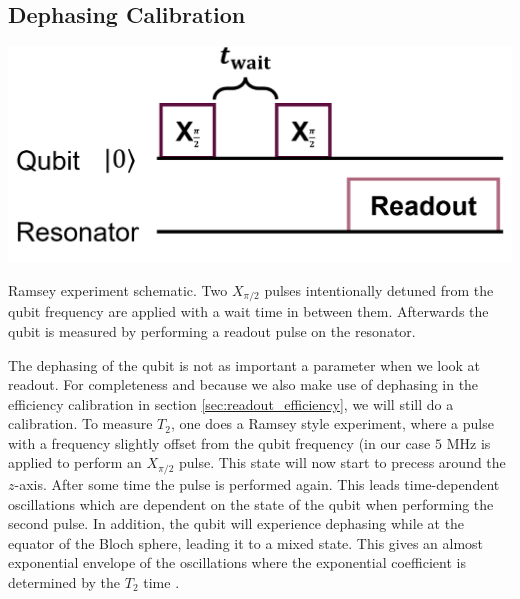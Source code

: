 \subsection{Dephasing Calibration}
\begin{marginfigure}
    \centering
    \includegraphics{Figs/circuits/t2.png}
    \caption{Ramsey experiment schematic. Two $X_{\pi/2}$ pulses intentionally detuned from the qubit frequency are applied with a wait time in between them. Afterwards the qubit is measured by performing a readout pulse on the resonator.}
    \label{fig:enter-label}
\end{marginfigure}
The dephasing of the qubit is not as important a parameter when we look at readout. For completeness and because we also make use of dephasing in the efficiency calibration in section \ref{sec:readout_efficiency}, we will still do a calibration. To measure $T_2$, one does a Ramsey style experiment, where a pulse with a frequency slightly offset from the qubit frequency (in our case $5 \text{ MHz}$ is applied to perform an $X_{\pi/2}$ pulse. This state will now start to precess around the $z$-axis. After some time the pulse is performed again. This leads time-dependent oscillations which are dependent on the state of the qubit when performing the second pulse. In addition, the qubit will experience dephasing while at the equator of the Bloch sphere, leading it to a mixed state. This gives an almost exponential envelope of the oscillations where the exponential coefficient is determined by the $T_2$ time \cite{krantz_quantum_2019}.

